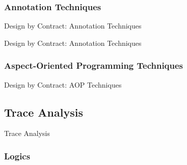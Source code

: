 \documentclass[12pt]{beamer}
\begin{document}
\subsubsection{Annotation Techniques}
\label{sec:runver-dbc-ann}

\begin{frame}{Design by Contract: Annotation Techniques}

\end{frame}

\begin{frame}{Design by Contract: Annotation Techniques}
\end{frame}

\subsubsection{Aspect-Oriented Programming Techniques}
\label{sec:runver-sbc-aop}

\begin{frame}{Design by Contract: AOP Techniques}

\end{frame}


\subsection{Trace Analysis}
\label{sec:runver-trace}

\begin{frame}{Trace Analysis}

\end{frame}

\subsubsection{Logics}
\label{sec:runver-trace-log}
\end{document}
